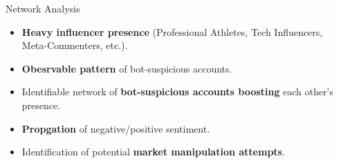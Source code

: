 \documentclass[final]{beamer}
\begin{document}
\begin{frame}[t]
\begin{columns}[t]
\begin{column}{0.98\paperwidth}
\begin{block}{Network Analysis}
\begin{minipage}[t]{.49\textwidth}
					{
					\begin{itemize}
						\item \textbf{Heavy influencer presence} (Professional Athletes, Tech Influencers, Meta-Commenters, etc.).
						\item \textbf{Obesrvable pattern} of bot-suspicious accounts.
						\item Identifiable network of \textbf{bot-suspicious accounts boosting} each other's presence.
						\item \textbf{Propgation} of negative/positive sentiment.
						\item Identification of potential \textbf{market manipulation attempts}.
					\end{itemize}
					}
				\end{minipage}%
			\end{block}
		\end{column}
		\begin{column}{0.01\paperwidth}\end{column}
	\end{columns}
\end{frame}
\end{document}

